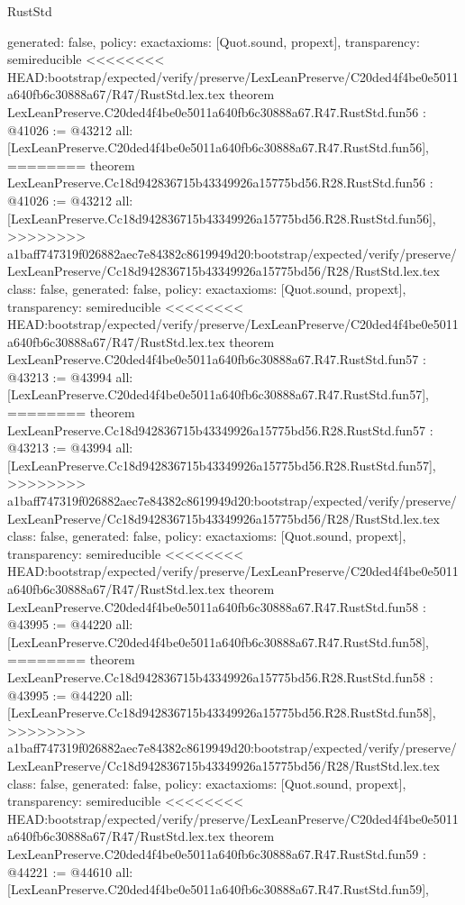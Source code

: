 \begin{lexlean}{RustStd}
\begin{coremodule}
{\begin{coremodule}
{{{{{{{{{{{{{{{{{{{{{{{{{{{{{{{{{{{{{{{{{{{{{{{{{{{{{{{{{{{  generated: false,
  policy: exact{axioms: [Quot.sound, propext]},
  transparency: semireducible
}
<<<<<<<< HEAD:bootstrap/expected/verify/preserve/LexLeanPreserve/C20ded4f4be0e5011a640fb6c30888a67/R47/RustStd.lex.tex
theorem LexLeanPreserve.C20ded4f4be0e5011a640fb6c30888a67.R47.RustStd.fun56 : @41026 := @43212 {
  all: [LexLeanPreserve.C20ded4f4be0e5011a640fb6c30888a67.R47.RustStd.fun56],
========
theorem LexLeanPreserve.Cc18d942836715b43349926a15775bd56.R28.RustStd.fun56 : @41026 := @43212 {
  all: [LexLeanPreserve.Cc18d942836715b43349926a15775bd56.R28.RustStd.fun56],
>>>>>>>> a1baff747319f026882aec7e84382c8619949d20:bootstrap/expected/verify/preserve/LexLeanPreserve/Cc18d942836715b43349926a15775bd56/R28/RustStd.lex.tex
  class: false,
  generated: false,
  policy: exact{axioms: [Quot.sound, propext]},
  transparency: semireducible
}
<<<<<<<< HEAD:bootstrap/expected/verify/preserve/LexLeanPreserve/C20ded4f4be0e5011a640fb6c30888a67/R47/RustStd.lex.tex
theorem LexLeanPreserve.C20ded4f4be0e5011a640fb6c30888a67.R47.RustStd.fun57 : @43213 := @43994 {
  all: [LexLeanPreserve.C20ded4f4be0e5011a640fb6c30888a67.R47.RustStd.fun57],
========
theorem LexLeanPreserve.Cc18d942836715b43349926a15775bd56.R28.RustStd.fun57 : @43213 := @43994 {
  all: [LexLeanPreserve.Cc18d942836715b43349926a15775bd56.R28.RustStd.fun57],
>>>>>>>> a1baff747319f026882aec7e84382c8619949d20:bootstrap/expected/verify/preserve/LexLeanPreserve/Cc18d942836715b43349926a15775bd56/R28/RustStd.lex.tex
  class: false,
  generated: false,
  policy: exact{axioms: [Quot.sound, propext]},
  transparency: semireducible
}
<<<<<<<< HEAD:bootstrap/expected/verify/preserve/LexLeanPreserve/C20ded4f4be0e5011a640fb6c30888a67/R47/RustStd.lex.tex
theorem LexLeanPreserve.C20ded4f4be0e5011a640fb6c30888a67.R47.RustStd.fun58 : @43995 := @44220 {
  all: [LexLeanPreserve.C20ded4f4be0e5011a640fb6c30888a67.R47.RustStd.fun58],
========
theorem LexLeanPreserve.Cc18d942836715b43349926a15775bd56.R28.RustStd.fun58 : @43995 := @44220 {
  all: [LexLeanPreserve.Cc18d942836715b43349926a15775bd56.R28.RustStd.fun58],
>>>>>>>> a1baff747319f026882aec7e84382c8619949d20:bootstrap/expected/verify/preserve/LexLeanPreserve/Cc18d942836715b43349926a15775bd56/R28/RustStd.lex.tex
  class: false,
  generated: false,
  policy: exact{axioms: [Quot.sound, propext]},
  transparency: semireducible
}
<<<<<<<< HEAD:bootstrap/expected/verify/preserve/LexLeanPreserve/C20ded4f4be0e5011a640fb6c30888a67/R47/RustStd.lex.tex
theorem LexLeanPreserve.C20ded4f4be0e5011a640fb6c30888a67.R47.RustStd.fun59 : @44221 := @44610 {
  all: [LexLeanPreserve.C20ded4f4be0e5011a640fb6c30888a67.R47.RustStd.fun59],
}}}}}}}}}}}}}}}}}}}}}}}}}}}}}}}}}}}}}}}}}}}}}}}}}}}}}}}}}}}}}}
\end{coremodule}}
\end{coremodule}
\end{lexlean}
